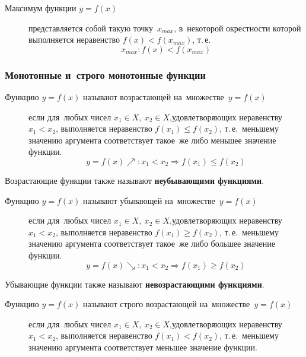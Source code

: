 \documentclass[]{scrartcl}
\begin{document}
{{\begin{description}
	\item[Максимум функции ${\textstyle y=f(x)}$] представляется собой такую точку~${\textstyle x_{max}}$, в~некоторой окрестности которой выполняется неравенство ${\textstyle f(x)<f(x_{max})}$, т.\,е.
	\begin{equation}\label{eq:function-13}
	x_{max}:f(x)<f(x_{max})
	\end{equation}
\end{description}

\subsubsection{Монотонные и~строго монотонные функции}
\begin{description}
	\item[Функцию ${\textstyle y=f(x)}$ называют возрастающей на~множестве~${\textstyle y=f(x)}$] если для~любых чисел ${\textstyle x_1 \in X,\ x_2 \in X}$,удовлетворяющих неравенству ${\textstyle x_1 < x_2}$, выполняется неравенство ${\textstyle f(x_1) \leq f(x_2)}$, т.\,е.~меньшему значению аргумента соответствует такое~же либо меньшее значение функции.
	\begin{equation}\label{eq:function-6}
	y=f(x)\nearrow :x_1 < x_2 \Rightarrow f(x_1) \leq f(x_2)
	\end{equation}
\end{description}
Возрастающие функции также называют \textbf{неубывающими функциями}.
\begin{description}
	\item[Функцию ${\textstyle y=f(x)}$ называют убывающей на~множестве~${\textstyle y=f(x)}$] если для~любых чисел ${\textstyle x_1 \in X,\ x_2 \in X}$,удовлетворяющих неравенству ${\textstyle x_1 < x_2}$, выполняется неравенство ${\textstyle f(x_1) \geq f(x_2)}$, т.\,е.~меньшему значению аргумента соответствует такое~же либо большее значение функции.
	\begin{equation}\label{eq:function-7}
	y=f(x)\searrow :x_1 < x_2 \Rightarrow f(x_1) \geq f(x_2)
	\end{equation}
\end{description}
Убывающие функции также называют \textbf{невозрастающими функциями}.
\begin{description}
	\item[Функцию ${\textstyle y=f(x)}$ называют строго возрастающей на~множестве~${\textstyle y=f(x)}$] если для~любых чисел ${\textstyle x_1 \in X,\ x_2 \in X}$,удовлетворяющих неравенству ${\textstyle x_1 < x_2}$, выполняется неравенство ${\textstyle f(x_1) < f(x_2)}$, т.\,е.~меньшему значению аргумента соответствует меньшее значение функции.

\end{description}}}
\end{document}

